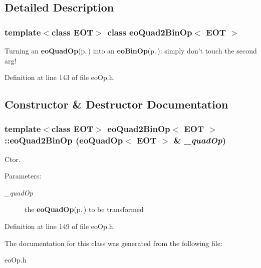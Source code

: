 \subsection{Detailed Description}
\subsubsection*{template$<$class EOT$>$ class eo\-Quad2Bin\-Op$<$ EOT $>$}

Turning an {\bf eo\-Quad\-Op}{\rm (p.\,\pageref{classeo_quad_op})} into an {\bf eo\-Bin\-Op}{\rm (p.\,\pageref{classeo_bin_op})}: simply don't touch the second arg! 



Definition at line 143 of file eo\-Op.h.

\subsection{Constructor \& Destructor Documentation}
\subsubsection{\setlength{\rightskip}{0pt plus 5cm}template$<$class EOT$>$ {\bf eo\-Quad2Bin\-Op}$<$ {\bf EOT} $>$::{\bf eo\-Quad2Bin\-Op} ({\bf eo\-Quad\-Op}$<$ {\bf EOT} $>$ \& {\em \_\-quad\-Op})\hspace{0.3cm}{\tt  [inline]}}\label{classeo_quad2_bin_op_a0}


Ctor. 

\begin{Desc}
\item[Parameters:]
\begin{description}
\item[{\em \_\-quad\-Op}]the {\bf eo\-Quad\-Op}{\rm (p.\,\pageref{classeo_quad_op})} to be transformed \end{description}
\end{Desc}


Definition at line 149 of file eo\-Op.h.

The documentation for this class was generated from the following file:\begin{CompactItemize}
\item 
eo\-Op.h\end{CompactItemize}
